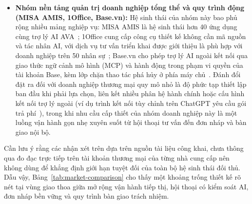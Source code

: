 \begin{itemize}
  \item \textbf{Nhóm nền tảng quản trị doanh nghiệp tổng thể và quy trình động (MISA AMIS, 1Office, Base.vn):} Hệ sinh thái của nhóm này bao phủ rộng nhiều mảng nghiệp vụ: MISA AMIS là hệ sinh thái hơn 40 ứng dụng cùng trợ lý AI AVA~\cite{misa-amis,misa-ava}; 1Office cung cấp công cụ thiết kế không cần mã nguồn và tác nhân AI, với dịch vụ tư vấn triển khai được giới thiệu là phù hợp với doanh nghiệp trên 50 nhân sự~\cite{1office-ai}; Base.vn cho phép trợ lý AI ngoài kết nối qua giao thức ngữ cảnh mô hình (MCP) và hành động trong phạm vi quyền của tài khoản Base, kèm lớp chặn thao tác phá hủy ở phía máy chủ~\cite{base-mcp}. Đánh đổi đặt ra đối với doanh nghiệp thương mại quy mô nhỏ là độ phức tạp thiết lập ban đầu khi phải lựa chọn, liên kết nhiều phân hệ hành chính hoặc cấu hình kết nối trợ lý ngoài (ví dụ trình kết nối tùy chỉnh trên ChatGPT yêu cầu gói trả phí~\cite{base-mcp}), trong khi nhu cầu cấp thiết của nhóm doanh nghiệp này là một luồng vận hành gọn nhẹ xuyên suốt từ hội thoại tư vấn đến đơn nháp và bàn giao nội bộ.
\end{itemize}

Cần lưu ý rằng các nhận xét trên dựa trên nguồn tài liệu công khai, chưa thông qua đo đạc trực tiếp trên tài khoản thương mại của từng nhà cung cấp nên không dùng để khẳng định giới hạn tuyệt đối của toàn bộ hệ sinh thái đối thủ. Dẫu vậy, Bảng~\ref{tab:market-comparison} cho thấy một khoảng trống thiết kế rõ nét tại vùng giao thoa giữa mở rộng vận hành tiếp thị, hội thoại có kiểm soát AI, đơn nháp bền vững và quy trình bàn giao trách nhiệm.

